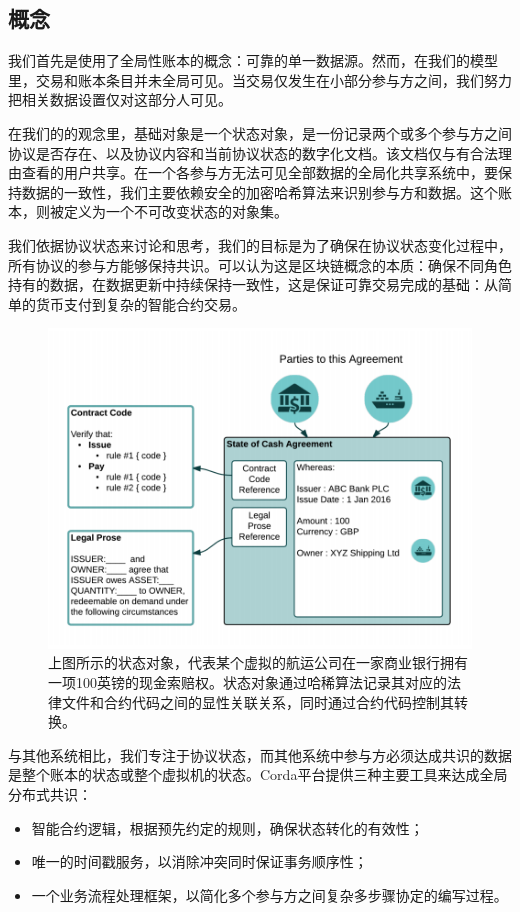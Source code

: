 \documentclass[UTF8]{ctexart}
\begin{document}
\subsection{概念}
我们首先是使用了全局性账本的概念：可靠的单一数据源。然而，在我们的模型里，交易和账本条目并未全局可见。当交易仅发生在小部分参与方之间，我们努力把相关数据设置仅对这部分人可见。 

在我们的的观念里，基础对象是一个状态对象，是一份记录两个或多个参与方之间协议是否存在、以及协议内容和当前协议状态的数字化文档。该文档仅与有合法理由查看的用户共享。在一个各参与方无法可见全部数据的全局化共享系统中，要保持数据的一致性，我们主要依赖安全的加密哈希算法来识别参与方和数据。这个账本，则被定义为一个不可改变状态的对象集。

我们依据协议状态来讨论和思考，我们的目标是为了确保在协议状态变化过程中，所有协议的参与方能够保持共识。可以认为这是区块链概念的本质：确保不同角色持有的数据，在数据更新中持续保持一致性，这是保证可靠交易完成的基础：从简单的货币支付到复杂的智能合约交易。

\begin{figure}[H]
\includegraphics[scale = .4, center]{partiesto}
\caption{上图所示的状态对象，代表某个虚拟的航运公司在一家商业银行拥有一项100英镑的现金索赔权。状态对象通过哈稀算法记录其对应的法律文件和合约代码之间的显性关联关系，同时通过合约代码控制其转换。}
\end{figure}

与其他系统相比，我们专注于协议状态，而其他系统中参与方必须达成共识的数据是整个账本的状态或整个虚拟机的状态。Corda平台提供三种主要工具来达成全局分布式共识：
\begin{itemize}
  \item  智能合约逻辑，根据预先约定的规则，确保状态转化的有效性；
   \item  唯一的时间戳服务，以消除冲突同时保证事务顺序性；
  \item   一个业务流程处理框架，以简化多个参与方之间复杂多步骤协定的编写过程。
    \end{itemize}
    
\end{document}
